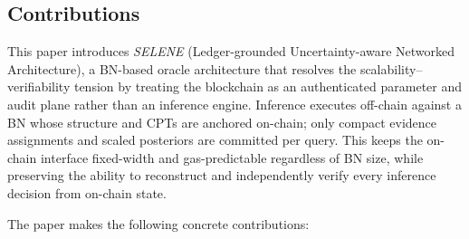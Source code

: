 \documentclass[journal]{IEEEtran}
\begin{document}
\subsection{Contributions}

This paper introduces \emph{SELENE} (Ledger-grounded
Uncertainty-aware Networked Architecture), a BN-based
oracle architecture that resolves the
scalability--verifiability tension by treating the
blockchain as an authenticated parameter and audit plane
rather than an inference engine.
Inference executes off-chain against a BN whose structure
and CPTs are anchored on-chain; only compact evidence
assignments and scaled posteriors are committed per query.
This keeps the on-chain interface fixed-width and
gas-predictable regardless of BN size, while preserving
the ability to reconstruct and independently verify every
inference decision from on-chain state.

The paper makes the following concrete contributions:
\end{document}
